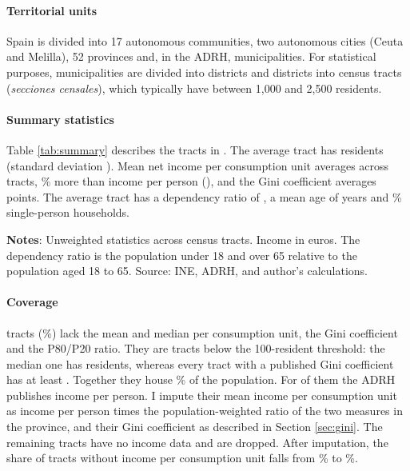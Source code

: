 \paragraph{Territorial units} Spain is divided into 17 autonomous communities, two autonomous cities (Ceuta and Melilla), 52 provinces and, in the ADRH, \MunAdrh{} municipalities. For statistical purposes, municipalities are divided into districts and districts into census tracts (\textit{secciones censales}), which typically have between 1,000 and 2,500 residents.

\paragraph{Summary statistics} Table \ref{tab:summary} describes the \TractsTotal{} tracts in \BaseYear{}. The average tract has \TractPopMean{} residents (standard deviation \TractPopSD{}). Mean net income per consumption unit averages \texteuro\TractEquivMean{} across tracts, \EquivOverPcPct{}\% more than income per person (\texteuro\TractPcMean{}), and the Gini coefficient averages \TractGiniMean{} points. The average tract has a dependency ratio of \TractDepRatioMean{}, a mean age of \TractMeanAge{} years and \TractSingleHhMean{}\% single-person households.

\begin{table}[H]
\centering
\begin{threeparttable}
\onehalfspacing
\caption{Summary statistics, census tracts}\label{tab:summary}
\footnotesize

\begin{tablenotes}
\scriptsize
\textbf{Notes}: Unweighted statistics across census tracts. Income in \BaseYear{} euros. The dependency ratio is the population under 18 and over 65 relative to the population aged 18 to 65. Source: INE, ADRH, and author's calculations.
\end{tablenotes}
\end{threeparttable}
\end{table}

\paragraph{Coverage} \GiniMissTracts{} tracts (\GiniMissPct{}\%) lack the mean and median per consumption unit, the Gini coefficient and the P80/P20 ratio. They are tracts below the 100-resident threshold: the median one has \GiniMissMedianPop{} residents, whereas every tract with a published Gini coefficient has at least \ObsGiniMinPop{}. Together they house \GiniMissPopPct{}\% of the population. For \GiniImputedTracts{} of them the ADRH publishes income per person. I impute their mean income per consumption unit as income per person times the population-weighted ratio of the two measures in the province, and their Gini coefficient as described in Section \ref{sec:gini}. The remaining \TractsDropped{} tracts have no income data and are dropped. After imputation, the share of tracts without income per consumption unit falls from \MissEquivPct{}\% to \MissEquivAfterPct{}\%.
